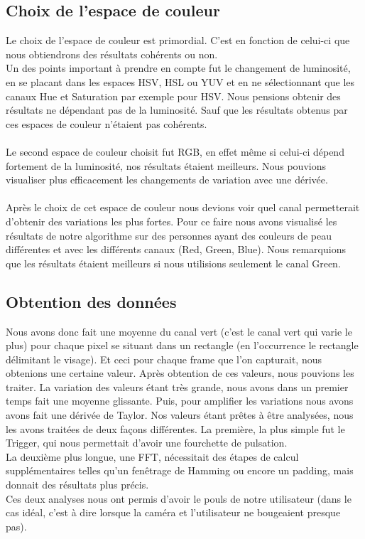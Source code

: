 \subsection{Choix de l'espace de couleur}
 Le choix de l'espace de couleur est primordial. C'est en fonction de celui-ci que nous obtiendrons des résultats cohérents ou non.\\
 Un des points important à prendre en compte fut le changement de luminosité, en se placant dans les espaces HSV, HSL ou YUV et en ne sélectionnant que les canaux Hue et Saturation par exemple pour HSV. Nous
  pensions obtenir des résultats ne dépendant pas de la luminosité. Sauf que les résultats obtenus par ces espaces de couleur n'étaient pas cohérents.\\
 \\
 Le second espace de couleur choisit fut RGB, en effet même si celui-ci dépend fortement de la luminosité, nos résultats étaient meilleurs. Nous pouvions visualiser plus efficacement les changements de
 variation avec une dérivée.\\
 \\
 Après le choix de cet espace de couleur nous devions voir quel canal permetterait d'obtenir des variations les plus fortes. Pour ce faire nous avons visualisé les résultats de notre algorithme sur des personnes ayant des couleurs de peau différentes et avec les différents canaux (Red, Green, Blue). Nous remarquions que les résultats étaient meilleurs si nous utilisions seulement le canal Green.


 \subsection{Obtention des données}
 Nous avons donc fait une moyenne du canal vert (c'est le canal vert qui varie le plus) pour chaque pixel se situant dans un rectangle (en l’occurrence le rectangle délimitant le visage).
 Et ceci pour chaque frame que l'on capturait, nous obtenions une certaine valeur.
 Après obtention de ces valeurs, nous pouvions les traiter.
 La variation des valeurs étant très grande, nous avons dans un premier temps fait une moyenne glissante. Puis, pour amplifier les variations nous avons avons fait une dérivée de Taylor.
 Nos valeurs étant prêtes à être analysées, nous les avons traitées de deux façons différentes.
 La première, la plus simple fut le Trigger, qui nous permettait d'avoir une fourchette de pulsation.\\ La deuxième plus longue, une FFT, nécessitait des étapes de calcul supplémentaires telles qu'un fenêtrage de Hamming ou encore un padding, mais donnait des résultats plus précis.
 \\
 Ces deux analyses nous ont permis d'avoir le pouls de notre utilisateur (dans le cas idéal, c'est à dire lorsque la caméra et l'utilisateur ne bougeaient presque pas).
 \\

